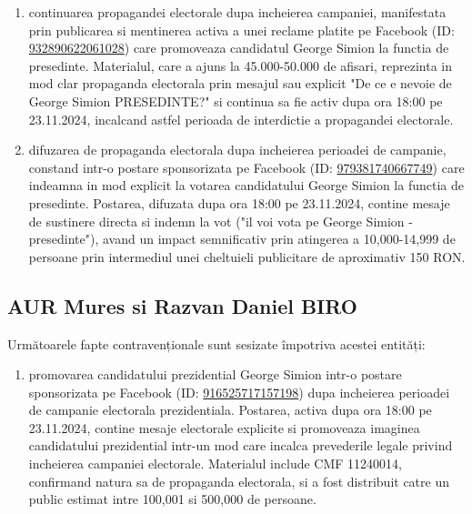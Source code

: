 \documentclass[a4paper,12pt]{article}
\begin{document}
\begin{enumerate}[leftmargin=*, label=\arabic*.)]
    \item continuarea propagandei electorale dupa incheierea campaniei, manifestata prin publicarea si mentinerea activa a unei reclame platite pe Facebook (ID: \href{https://www.facebook.com/ads/library/?id=932890622061028}{932890622061028}) care promoveaza candidatul George Simion la functia de presedinte. Materialul, care a ajuns la 45.000-50.000 de afisari, reprezinta in mod clar propaganda electorala prin mesajul sau explicit "De ce e nevoie de George Simion PRESEDINTE?" si continua sa fie activ dupa ora 18:00 pe 23.11.2024, incalcand astfel perioada de interdictie a propagandei electorale.
    \item difuzarea de propaganda electorala dupa incheierea perioadei de campanie, constand intr-o postare sponsorizata pe Facebook (ID: \href{https://www.facebook.com/ads/library/?id=979381740667749}{979381740667749}) care indeamna in mod explicit la votarea candidatului George Simion la functia de presedinte. Postarea, difuzata dupa ora 18:00 pe 23.11.2024, contine mesaje de sustinere directa si indemn la vot ("il voi vota pe George Simion - presedinte"), avand un impact semnificativ prin atingerea a 10,000-14,999 de persoane prin intermediul unei cheltuieli publicitare de aproximativ 150 RON.
\end{enumerate}

\vspace{0.5cm}

\subsection{AUR Mures si Razvan Daniel BIRO}
Următoarele fapte contravenționale sunt sesizate împotriva acestei entități:

\begin{enumerate}[leftmargin=*, label=\arabic*.)]
    \item promovarea candidatului prezidential George Simion intr-o postare sponsorizata pe Facebook (ID: \href{https://www.facebook.com/ads/library/?id=916525717157198}{916525717157198}) dupa incheierea perioadei de campanie electorala prezidentiala. Postarea, activa dupa ora 18:00 pe 23.11.2024, contine mesaje electorale explicite si promoveaza imaginea candidatului prezidential intr-un mod care incalca prevederile legale privind incheierea campaniei electorale. Materialul include CMF 11240014, confirmand natura sa de propaganda electorala, si a fost distribuit catre un public estimat intre 100,001 si 500,000 de persoane.
\end{enumerate}
\end{document}
